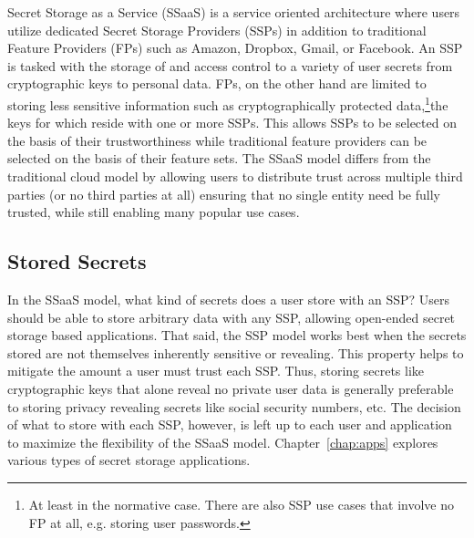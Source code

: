 Secret Storage as a Service (SSaaS) is a service oriented architecture
where users utilize dedicated Secret Storage Providers (SSPs) in
addition to traditional Feature Providers (FPs) such as Amazon,
Dropbox, Gmail, or Facebook. An SSP is tasked with the storage of and
access control to a variety of user secrets from cryptographic keys to
personal data. FPs, on the other hand are limited to storing less
sensitive information such as cryptographically protected
data,\footnote{At least in the normative case. There are also SSP use
  cases that involve no FP at all, e.g. storing user passwords.}the
keys for which reside with one or more SSPs. This allows SSPs to be
selected on the basis of their trustworthiness while traditional
feature providers can be selected on the basis of their feature
sets. The SSaaS model differs from the traditional cloud model by
allowing users to distribute trust across multiple third parties (or
no third parties at all) ensuring that no single entity need be fully
trusted, while still enabling many popular use cases.

\subsection{Stored Secrets}

In the SSaaS model, what kind of secrets does a user store with an
SSP? Users should be able to store arbitrary data with any SSP,
allowing open-ended secret storage based applications. That said, the
SSP model works best when the secrets stored are not themselves
inherently sensitive or revealing. This property helps to mitigate the
amount a user must trust each SSP. Thus, storing secrets like
cryptographic keys that alone reveal no private user data is generally
preferable to storing privacy revealing secrets like social security
numbers, etc. The decision of what to store with each SSP, however, is
left up to each user and application to maximize the flexibility of
the SSaaS model. Chapter~\ref{chap:apps} explores various types of
secret storage applications.

